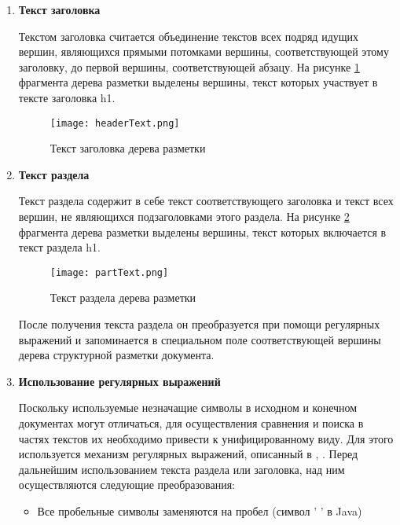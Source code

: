\begin{enumerate}
\item \textbf{Текст заголовка}

Текстом заголовка считается объединение текстов всех подряд идущих вершин, являющихся прямыми потомками вершины, соответствующей этому заголовку, до первой вершины, соответствующей абзацу. На рисунке \ref{sys:headertext} фрагмента дерева разметки выделены вершины, текст которых участвует в тексте заголовка h1.

\begin{figure}[h]
\begin{center}
\texttt{[image: headerText.png]}
\caption{Текст заголовка дерева разметки}
\label{sys:headertext}
\end{center}
\end{figure}

\item \textbf{Текст раздела}

Текст раздела содержит в себе текст соответствующего заголовка и текст всех вершин, не являющихся подзаголовками этого раздела. На рисунке \ref{sys:parttext} фрагмента дерева разметки выделены вершины, текст которых включается в текст раздела h1.

\begin{figure}[h]
\begin{center}
\texttt{[image: partText.png]}
\caption{Текст раздела дерева разметки}
\label{sys:parttext}
\end{center}
\end{figure}

После получения текста раздела он преобразуется при помощи регулярных выражений и запоминается в специальном поле соответствующей вершины дерева структурной разметки документа.

\item \textbf{Использование регулярных выражений}

Поскольку используемые незначащие символы в исходном и конечном документах могут отличаться, для осуществления сравнения и поиска в частях текстов их необходимо привести к унифицированному виду. Для этого используется механизм регулярных выражений, описанный в \cite{book:RegExp}, \cite{web:Reg}. Перед дальнейшим использованием текста раздела или заголовка, над ним осуществляются следующие преобразования:

\begin{itemize}
\item Все пробельные символы заменяются на пробел (символ ' ' в Java)


\end{itemize}
\end{enumerate}
